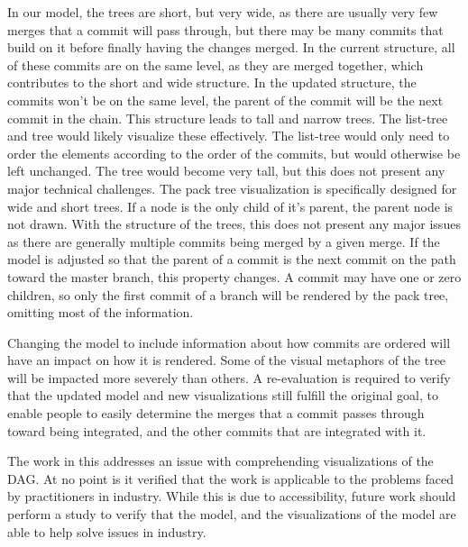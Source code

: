 In our model, the trees are short, but very wide, as there are usually
very few merges that a commit will pass through, but there may be many
commits that build on it before finally having the changes merged.
In the current structure, all of these commits are on the same level, as
they are merged together, which contributes to the short and wide
structure.
In the updated structure, the commits won't be on the same level, the
parent of the commit will be the next commit in the chain.
This structure leads to tall and narrow trees.
The list-tree and \rt{} tree would likely visualize these effectively.
The list-tree would only need to order the elements according to the
order of the commits, but would otherwise be left unchanged.
The \rt{} tree would become very tall, but this does not present any
major technical challenges.
The pack tree visualization is specifically designed for wide and short
trees.
If a node is the only child of it's parent, the parent node is not
drawn.
With the structure of the trees, this does not present any major issues
as there are generally multiple commits being merged by a given merge.
If the model is adjusted so that the parent of a commit is the next
commit on the path toward the master branch, this property changes.
A commit may have one or zero children, so only the first commit of a
branch will be rendered by the pack tree, omitting most of the
information.

Changing the model to include information about how commits are ordered
will have an impact on how it is rendered.
Some of the visual metaphors of the tree will be impacted more severely
than others.
A re-evaluation is required to verify that the updated model and new
visualizations still fulfill the original goal, to enable people to
easily determine the merges that a commit passes through toward being
integrated, and the other commits that are integrated with it.

The work in this \paper{} addresses an issue with comprehending
visualizations of the DAG\@.
At no point is it verified that the work is applicable to the problems
faced by practitioners in industry.
While this is due to accessibility,
future work should perform a study to verify that the \mt{} model,
and the visualizations of the model are able to help solve issues in industry.
